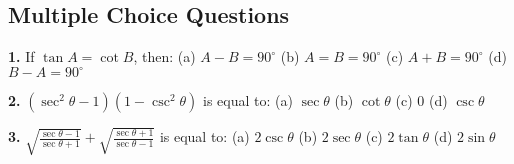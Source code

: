\documentclass{article}
\begin{document}
	
	\subsection*{Multiple Choice Questions}
	
	\textbf{1.} If $\tan A = \cot B$, then:  
	(a) $A - B = 90^\circ$ \qquad (b) $A = B = 90^\circ$ \qquad (c) $A + B = 90^\circ$ \qquad (d) $B - A = 90^\circ$
	
	\vspace{0.3cm}
	
	\textbf{2.} $(\sec^2 \theta - 1)(1 - \csc^2 \theta)$ is equal to:  
	(a) $\sec \theta$ \qquad (b) $\cot \theta$ \qquad (c) 0 \qquad (d) $\csc \theta$
	
	\vspace{0.3cm}
	
	\textbf{3.} $\sqrt{\frac{\sec \theta - 1}{\sec \theta + 1}} + \sqrt{\frac{\sec \theta + 1}{\sec \theta - 1}}$ is equal to:  
	(a) $2\csc \theta$ \qquad (b) $2\sec \theta$ \qquad (c) $2\tan \theta$ \qquad (d) $2\sin \theta$
	
\end{document}
